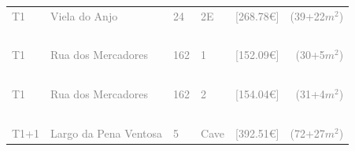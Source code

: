 \documentclass[]{report}
\begin{document}
\begin{table}[]
	\begin{center}
		\begin{huge}
			\begin{tabular}{lllllr}
				\textcolor{gray}{T1}&
				\textcolor{gray}{Viela do Anjo}&
				\textcolor{gray}{24}&
				\textcolor{gray}{2E}&
				\textcolor{gray}{[268.78€]} &
				\textcolor{gray}{(39+22$m^{2}$)} \\
				&&&&&~\\
				\textcolor{gray}{T1}&
				\textcolor{gray}{Rua dos Mercadores}&
				\textcolor{gray}{162}&
				\textcolor{gray}{1}&
				\textcolor{gray}{[152.09€]} &
				\textcolor{gray}{(30+5$m^{2}$)} \\
				&&&&&~\\
				\textcolor{gray}{T1}&
				\textcolor{gray}{Rua dos Mercadores}&
				\textcolor{gray}{162}&
				\textcolor{gray}{2}&
				\textcolor{gray}{[154.04€]} &
				\textcolor{gray}{(31+4$m^{2}$)} \\
				&&&&&~\\
				\textcolor{gray}{T1+1}&
				\textcolor{gray}{Largo da Pena Ventosa}&
				\textcolor{gray}{5}&
				\textcolor{gray}{Cave}&
				\textcolor{gray}{[392.51€]}&
				\textcolor{gray}{(72+27$m^{2}$)}\\
			\end{tabular}
		\end{huge}
	\end{center}
\end{table}
\end{document}
